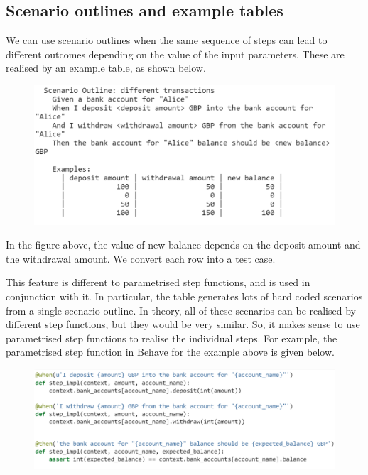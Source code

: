 \documentclass[a4paper, openany]{memoir}
\begin{document}
\subsection{Scenario outlines and example tables}
We can use scenario outlines when the same sequence of steps can lead to different outcomes depending on the value of the input parameters. These are realised by an example table, as shown below.
\begin{figure}[H]
    \centering
    \includegraphics[scale=0.5]{src/11 BDD Scenario Outline and Example Tables.PNG}
\end{figure}
\noindent In the figure above, the value of new balance depends on the deposit amount and the withdrawal amount. We convert each row into a test case.

This feature is different to parametrised step functions, and is used in conjunction with it. In particular, the table generates lots of hard coded scenarios from a single scenario outline. In theory, all of these scenarios can be realised by different step functions, but they would be very similar. So, it makes sense to use parametrised step functions to realise the individual steps. For example, the parametrised step function in Behave for the example above is given below.
\begin{figure}[H]
    \centering
    \includegraphics[scale=0.4]{src/11 BDD Python parametrised for scenario outline.PNG}
\end{figure}
\end{document}
